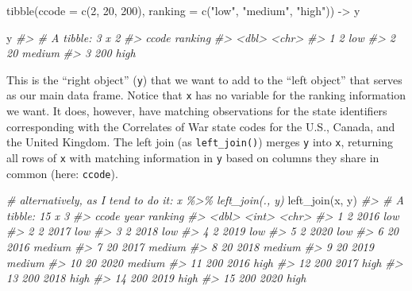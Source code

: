 \documentclass[
  11pt,
]{article}
\newenvironment{Shaded}{\begin{snugshade}}{\end{snugshade}}
\newcommand{\AttributeTok}[1]{\textcolor[rgb]{0.77,0.63,0.00}{#1}}
\newcommand{\CommentTok}[1]{\textcolor[rgb]{0.56,0.35,0.01}{\textit{#1}}}
\newcommand{\DecValTok}[1]{\textcolor[rgb]{0.00,0.00,0.81}{#1}}
\newcommand{\FunctionTok}[1]{\textcolor[rgb]{0.00,0.00,0.00}{#1}}
\newcommand{\NormalTok}[1]{#1}
\newcommand{\OtherTok}[1]{\textcolor[rgb]{0.56,0.35,0.01}{#1}}
\newcommand{\StringTok}[1]{\textcolor[rgb]{0.31,0.60,0.02}{#1}}
\begin{document}
\begin{Shaded}
\begin{Highlighting}[]
\FunctionTok{tibble}\NormalTok{(}\AttributeTok{ccode =} \FunctionTok{c}\NormalTok{(}\DecValTok{2}\NormalTok{, }\DecValTok{20}\NormalTok{, }\DecValTok{200}\NormalTok{),}
       \AttributeTok{ranking =} \FunctionTok{c}\NormalTok{(}\StringTok{"low"}\NormalTok{, }\StringTok{"medium"}\NormalTok{, }\StringTok{"high"}\NormalTok{)) }\OtherTok{{-}\textgreater{}}\NormalTok{ y}

\NormalTok{y}
\CommentTok{\#\textgreater{} \# A tibble: 3 x 2}
\CommentTok{\#\textgreater{}   ccode ranking}
\CommentTok{\#\textgreater{}   \textless{}dbl\textgreater{} \textless{}chr\textgreater{}  }
\CommentTok{\#\textgreater{} 1     2 low    }
\CommentTok{\#\textgreater{} 2    20 medium }
\CommentTok{\#\textgreater{} 3   200 high}
\end{Highlighting}
\end{Shaded}

This is the ``right object'' (\texttt{y}) that we want to add to the ``left object'' that serves as our main data frame. Notice that \texttt{x} has no variable for the ranking information we want. It does, however, have matching observations for the state identifiers corresponding with the Correlates of War state codes for the U.S., Canada, and the United Kingdom. The left join (as \texttt{left\_join()}) merges \texttt{y} into \texttt{x}, returning all rows of \texttt{x} with matching information in \texttt{y} based on columns they share in common (here: \texttt{ccode}).

\begin{Shaded}
\begin{Highlighting}[]
\CommentTok{\# alternatively, as I tend to do it: x \%\textgreater{}\% left\_join(., y)}
\FunctionTok{left\_join}\NormalTok{(x, y)}
\CommentTok{\#\textgreater{} \# A tibble: 15 x 3}
\CommentTok{\#\textgreater{}    ccode  year ranking}
\CommentTok{\#\textgreater{}    \textless{}dbl\textgreater{} \textless{}int\textgreater{} \textless{}chr\textgreater{}  }
\CommentTok{\#\textgreater{}  1     2  2016 low    }
\CommentTok{\#\textgreater{}  2     2  2017 low    }
\CommentTok{\#\textgreater{}  3     2  2018 low    }
\CommentTok{\#\textgreater{}  4     2  2019 low    }
\CommentTok{\#\textgreater{}  5     2  2020 low    }
\CommentTok{\#\textgreater{}  6    20  2016 medium }
\CommentTok{\#\textgreater{}  7    20  2017 medium }
\CommentTok{\#\textgreater{}  8    20  2018 medium }
\CommentTok{\#\textgreater{}  9    20  2019 medium }
\CommentTok{\#\textgreater{} 10    20  2020 medium }
\CommentTok{\#\textgreater{} 11   200  2016 high   }
\CommentTok{\#\textgreater{} 12   200  2017 high   }
\CommentTok{\#\textgreater{} 13   200  2018 high   }
\CommentTok{\#\textgreater{} 14   200  2019 high   }
\CommentTok{\#\textgreater{} 15   200  2020 high}
\end{Highlighting}
\end{Shaded}
\end{document}
